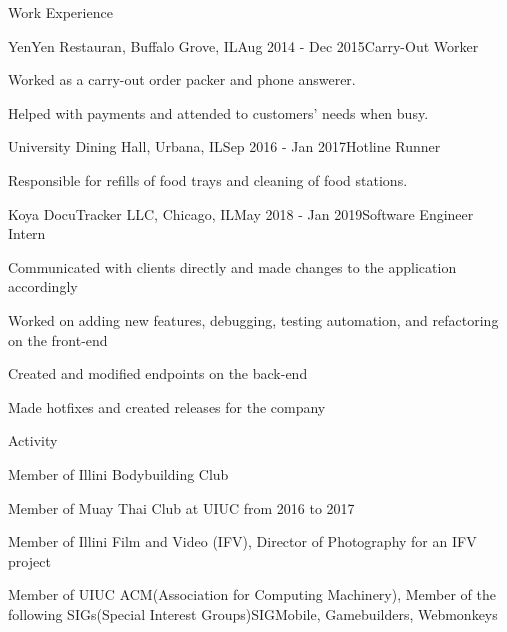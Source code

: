 \documentclass{resume}
\begin{document}
\begin{rSection}{Work Experience}

\begin{rSubsection}{YenYen Restauran, Buffalo Grove, IL}{Aug 2014 - Dec 2015}{Carry-Out Worker}{}
\item Worked as a carry-out order packer and phone answerer.
\item Helped with payments and attended to customers' needs when busy.
\end{rSubsection}

\begin{rSubsection}{University Dining Hall, Urbana, IL}{Sep 2016 - Jan 2017}{Hotline Runner}{}
\item Responsible for refills of food trays and cleaning of food stations.
\end{rSubsection}

\begin{rSubsection}{Koya DocuTracker LLC, Chicago, IL}{May 2018 - Jan 2019}{Software Engineer Intern}{}
\item Communicated with clients directly and made changes to the application accordingly
\item Worked on adding new features, debugging, testing automation, and refactoring on the front-end
\item Created and modified endpoints on the back-end
\item Made hotfixes and created releases for the company

\end{rSubsection}

\end{rSection}

\begin{rSection}{Activity} \itemsep -3pt

    \item Member of Illini Bodybuilding Club
    \item Member of Muay Thai Club at UIUC from 2016 to 2017
    \item Member of Illini Film and Video (IFV), Director of Photography for an IFV project
    \item Member of UIUC ACM(Association for Computing Machinery), Member of the following SIGs(Special Interest Groups)\colon SIGMobile, Gamebuilders, Webmonkeys

\end{rSection}
\end{document}
